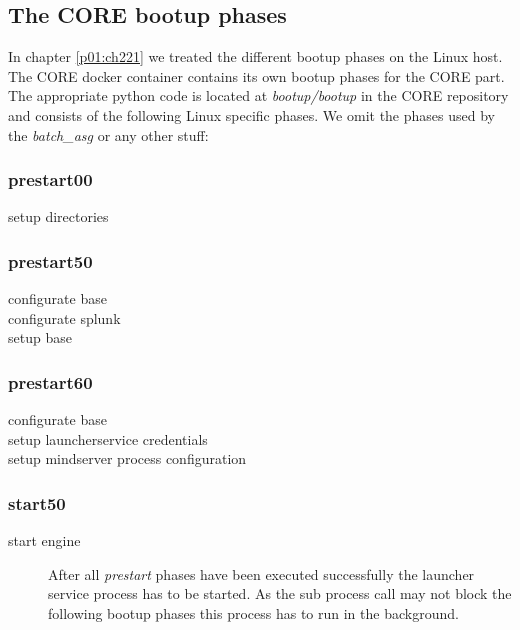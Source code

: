 		\subsection{The CORE bootup phases}
		In chapter \ref{p01:ch221} we treated the different bootup phases on the Linux host. The CORE docker container contains its own bootup phases for the CORE part. The appropriate python code is located at \emph{bootup/bootup} in the CORE repository and consists of the following Linux specific phases. We omit the phases used by the \emph{batch\_asg} or any other stuff:
			
			\subsubsection{prestart00}
			\begin{description}
				\item[setup directories]
			\end{description}
			\subsubsection{prestart50}
			\begin{description}
				\item[configurate base]
				\item[configurate splunk]
				\item[setup base]
			\end{description}
			\subsubsection{prestart60}
			\begin{description}
				\item[configurate base]
				\item[setup launcherservice credentials]
				\item[setup mindserver process configuration]
			\end{description}
			\subsubsection{start50}
			\begin{description}
				\item[start engine] After all \emph{prestart} phases have been executed successfully the launcher service process has to be started. As the sub process call may not block the following bootup phases this process has to run in the background.
			\end{description}
